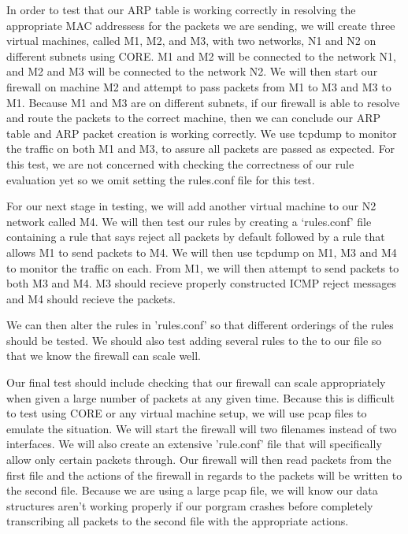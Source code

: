 \documentclass[12pt]{article} %
\begin{document}
In order to test that our ARP table is working correctly in resolving the 
appropriate MAC addressess for the packets we are sending, we will create 
three virtual machines, called M1, M2, and M3, with two networks, N1 and N2 on
different subnets using CORE. M1 and M2 will be connected to the network N1, and M2 and M3 
will be connected to the network N2. We will then start our firewall on machine M2 and 
attempt to pass packets from M1 to M3 and M3 to M1. Because M1 and M3 are on different subnets,
if our firewall is able to resolve and route the packets to the correct machine,
then we can conclude our ARP table and ARP packet creation is working correctly. 
We use tcpdump to monitor the traffic on both M1 and M3, to assure all packets are passed
as expected. For this test, we are not concerned with checking the correctness of our rule evaluation yet 
so we omit setting the rules.conf file for this test.

For our next stage in testing, we will add another virtual machine to our N2 network called
M4. We will then test our rules by creating a `rules.conf' file containing a rule that says reject
all packets by default followed by a rule that allows M1 to send packets to M4. We will then use tcpdump
on M1, M3 and M4 to monitor the traffic on each. From M1, we will then attempt to send packets to both M3 and M4. 
M3 should recieve properly constructed ICMP reject messages and M4 should recieve the packets. 

We can then alter the rules in 'rules.conf' so that different orderings of the rules should be tested. We should
also test adding several rules to the to our file so that we know the firewall can scale well. 

Our final test should include checking that our firewall can scale appropriately when given a large number of packets at any given time. 
Because this is difficult to test using CORE or any virtual machine setup, we will use pcap files to emulate the situation.
We will start the firewall will two filenames instead of two interfaces. We will also create an extensive 'rule.conf' file that will specifically 
allow only certain packets through. Our firewall will then read packets from the first file and the actions of the firewall in regards to the 
packets will be written to the second file. Because we are using a large pcap file, we will know our data structures aren't working properly
if our porgram crashes before completely transcribing all packets to the second file with the appropriate actions.
\end{document}
